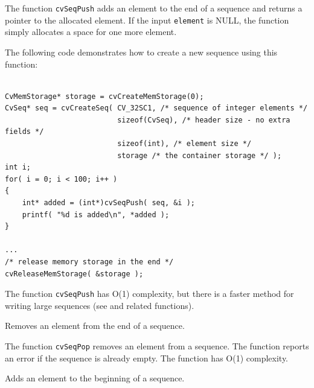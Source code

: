 The function \texttt{cvSeqPush} adds an element to the end of a sequence and returns a pointer to the allocated element. If the input \texttt{element} is NULL, the function simply allocates a space for one more element.

The following code demonstrates how to create a new sequence using this function:

\begin{lstlisting}

CvMemStorage* storage = cvCreateMemStorage(0);
CvSeq* seq = cvCreateSeq( CV_32SC1, /* sequence of integer elements */
                          sizeof(CvSeq), /* header size - no extra fields */
                          sizeof(int), /* element size */
                          storage /* the container storage */ );
int i;
for( i = 0; i < 100; i++ )
{
    int* added = (int*)cvSeqPush( seq, &i );
    printf( "%d is added\n", *added );
}

...
/* release memory storage in the end */
cvReleaseMemStorage( &storage );

\end{lstlisting}

The function \texttt{cvSeqPush} has O(1) complexity, but there is a faster method for writing large sequences (see  and related functions).


\label{SeqPop}

Removes an element from the end of a sequence.


\begin{description}
\end{description}

The function \texttt{cvSeqPop} removes an element from a sequence. The function reports an error if the sequence is already empty. The function has O(1) complexity.

\label{SeqPushFront}

Adds an element to the beginning of a sequence.


